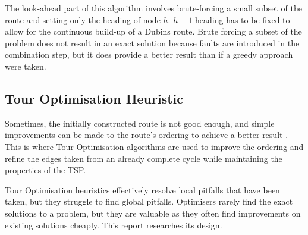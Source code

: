 The look-ahead part of this algorithm involves brute-forcing a small subset of the route and setting only the heading of node $h$. $h-1$ heading has to be fixed to allow for the continuous build-up of a Dubins route. Brute forcing a subset of the problem does not result in an exact solution because faults are introduced in the combination step, but it does provide a better result than if a greedy approach were taken.





\subsection{Tour Optimisation Heuristic}

Sometimes, the initially constructed route is not good enough, and simple improvements can be made to the route's ordering to achieve a better result \cite{Christian-tsp}. This is where Tour Optimisation algorithms are used to improve the ordering and refine the edges taken from an already complete cycle while maintaining the properties of the TSP\cite{Christian-tsp}.

Tour Optimisation heuristics effectively resolve local pitfalls that have been taken, but they struggle to find global pitfalls. Optimisers rarely find the exact solutions to a problem, but they are valuable as they often find improvements on existing solutions cheaply. This report researches its design.


